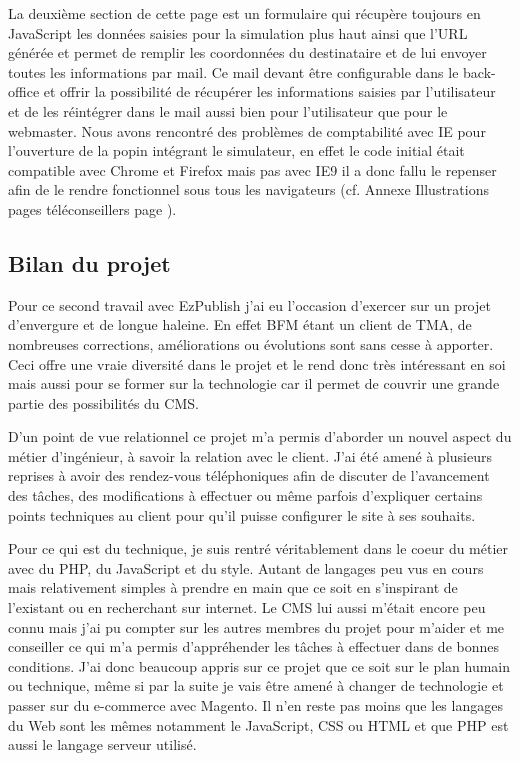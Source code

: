 \documentclass[a4paper,11pt,twoside]{report}
\begin{document}
      La deuxième section de cette page est un formulaire qui récupère toujours en JavaScript les données saisies pour la simulation plus haut ainsi que l'URL générée et permet de remplir les coordonnées du destinataire et de lui envoyer toutes les informations par mail. Ce mail devant être configurable dans le back-office et offrir la possibilité de récupérer les informations saisies par l'utilisateur et de les réintégrer dans le mail aussi bien pour l'utilisateur que pour le webmaster. 
      Nous avons rencontré des problèmes de comptabilité avec IE pour l'ouverture de la popin intégrant le simulateur, en effet le code initial était compatible avec Chrome et Firefox mais pas avec IE9 il a donc fallu le repenser afin de le rendre fonctionnel sous tous les navigateurs (cf. Annexe Illustrations pages téléconseillers page \pageref{illustrations_pages_teleconseillers}).
    \subsection*{Bilan du projet}
    Pour ce second travail avec EzPublish j'ai eu l'occasion d'exercer sur un projet d'envergure et de longue haleine. En effet BFM étant un client de TMA, de nombreuses corrections, améliorations ou évolutions sont sans cesse à apporter. Ceci offre une vraie diversité dans le projet et le rend donc très intéressant en soi mais aussi pour se former sur la technologie car il permet de couvrir une grande partie des possibilités du CMS. 
    
    D'un point de vue relationnel ce projet m'a permis d'aborder un nouvel aspect du métier d'ingénieur, à savoir la relation avec le client. J'ai été amené à plusieurs reprises à avoir des rendez-vous téléphoniques afin de discuter de l'avancement des tâches, des modifications à effectuer ou même parfois d'expliquer certains points techniques au client pour qu'il puisse configurer le site à ses souhaits. 
    
    Pour ce qui est du technique, je suis rentré véritablement dans le coeur du métier avec du PHP, du JavaScript et du style. Autant de langages peu vus en cours mais relativement simples à prendre en main que ce soit en s'inspirant de l'existant ou en recherchant sur internet. Le CMS lui aussi m'était encore peu connu mais j'ai pu compter sur les autres membres du projet pour m'aider et me conseiller ce qui m'a permis d'appréhender les tâches à effectuer dans de bonnes conditions. J'ai donc beaucoup appris sur ce projet que ce soit sur le plan humain ou technique, même si par la suite je vais être amené à changer de technologie et passer sur du e-commerce avec Magento. Il n'en reste pas moins que les langages du Web sont les mêmes notamment le JavaScript, CSS ou HTML et que PHP est aussi le langage serveur utilisé. 
    
\end{document}
